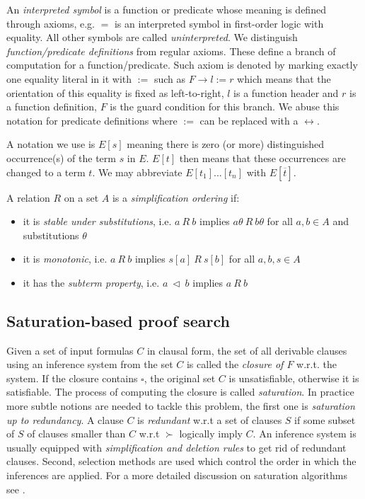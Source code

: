 An \textit{interpreted symbol} is a function or predicate whose meaning is defined through axioms, e.g. $=$ is an interpreted symbol in first-order logic with equality. All other symbols are called \textit{uninterpreted}. We distinguish \textit{function/predicate definitions} from regular axioms. These define a branch of computation for a function/predicate. Such axiom is denoted by marking exactly one equality literal in it with $:=$ such as $F\rightarrow l:=r$ which means that the orientation of this equality is fixed as left-to-right, $l$ is a function header and $r$ is a function definition, $F$ is the guard condition for this branch. We abuse this notation for predicate definitions where $:=$ can be replaced with a $\leftrightarrow$.

A notation we use is $E[s]$ meaning there is zero  (or more) distinguished occurrence(s) of the term $s$ in $E$. $E[t]$ then means that these occurrences are changed to a term $t$. We may abbreviate $E[t_1]...[t_n]$ with $E[\overline{t}]$.

A relation $R$ on a set $A$ is a \textit{simplification ordering} if:
\begin{itemize}
	\item it is \textit{stable under substitutions}, i.e. $a\ R\ b$ implies $a\theta\ R\ b\theta$ for all $a, b\in A$ and substitutions $\theta$
	\item it is \textit{monotonic}, i.e. $a\ R\ b$ implies $s[a]\ R\ s[b]$ for all $a,b,s\in A$
	\item it has the \textit{subterm property}, i.e. $a\ \triangleleft\ b$ implies $a\ R\ b$
\end{itemize}
\subsection{Saturation-based proof search}
Given a set of input formulas $C$ in clausal form, the set of all derivable clauses using an inference system from the set $C$ is called the \textit{closure of $F$} w.r.t. the system. If the closure contains $\square$, the original set $C$ is unsatisfiable, otherwise it is satisfiable. The process of computing the closure is called \textit{saturation}. In practice more subtle notions are needed to tackle this problem, the first one is \textit{saturation up to redundancy}. A clause $C$ is \textit{redundant} w.r.t a set of clauses $S$ if some subset of $S$ of clauses smaller than $C$ w.r.t $\succ$ logically imply $C$. An inference system is usually equipped with \textit{simplification and deletion rules} to get rid of redundant clauses. Second, selection methods are used which control the order in which the inferences are applied. For a more detailed discussion on saturation algorithms see \cite{cav13}.

